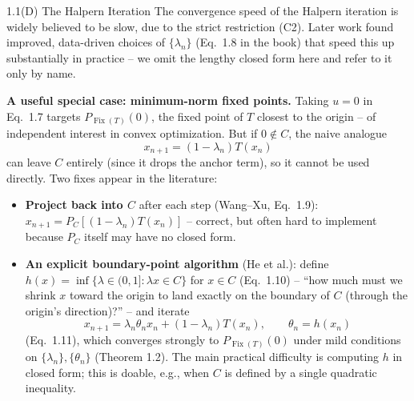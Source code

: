 \documentclass[aspectratio=169,10pt]{beamer}
\newcommand{\Fix}{\operatorname{Fix}}
\begin{document}
\begin{frame}[allowframebreaks]{1.1(D) The Halpern Iteration}
The convergence speed of the Halpern iteration is widely believed to be
slow, due to the strict restriction (C2). Later work found improved,
data-driven choices of $\{\lambda_n\}$ (Eq.\ 1.8 in the book) that speed
this up substantially in practice -- we omit the lengthy closed form here
and refer to it only by name.

\framebreak

\textbf{A useful special case: minimum-norm fixed points.} Taking $u=0$ in
Eq.\ 1.7 targets $P_{\Fix(T)}(0)$, the fixed point of $T$ closest to the
origin -- of independent interest in convex optimization. But if $0\notin
C$, the naive analogue
\[
  x_{n+1} = (1-\lambda_n)T(x_n)
\]
can leave $C$ entirely (since it drops the anchor term), so it cannot be
used directly. Two fixes appear in the literature:
\begin{itemize}
  \item \textbf{Project back into $C$} after each step (Wang--Xu, Eq.\
    1.9): $x_{n+1}=P_C[(1-\lambda_n)T(x_n)]$ -- correct, but often hard to
    implement because $P_C$ itself may have no closed form.
  \item \textbf{An explicit boundary-point algorithm} (He et al.):
    define $h(x)=\inf\{\lambda\in(0,1]:\lambda x\in C\}$ for $x\in C$
    (Eq.\ 1.10) -- ``how much must we shrink $x$ toward the origin to
    land exactly on the boundary of $C$ (through the origin's direction)?''
    -- and iterate
    \[
      x_{n+1} = \lambda_n\theta_n x_n + (1-\lambda_n)T(x_n), \qquad
      \theta_n = h(x_n)
    \]
    (Eq.\ 1.11), which converges strongly to $P_{\Fix(T)}(0)$ under mild
    conditions on $\{\lambda_n\},\{\theta_n\}$ (Theorem 1.2). The main
    practical difficulty is computing $h$ in closed form; this is doable,
    e.g., when $C$ is defined by a single quadratic inequality.
\end{itemize}

\end{frame}
\end{document}
